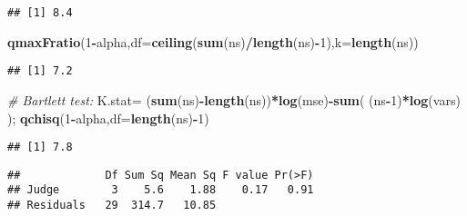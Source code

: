 \documentclass[12pt,]{book}
\newenvironment{Shaded}{\begin{snugshade}}{\end{snugshade}}
\newcommand{\KeywordTok}[1]{\textcolor[rgb]{0.13,0.29,0.53}{\textbf{#1}}}
\newcommand{\DataTypeTok}[1]{\textcolor[rgb]{0.13,0.29,0.53}{#1}}
\newcommand{\DecValTok}[1]{\textcolor[rgb]{0.00,0.00,0.81}{#1}}
\newcommand{\StringTok}[1]{\textcolor[rgb]{0.31,0.60,0.02}{#1}}
\newcommand{\CommentTok}[1]{\textcolor[rgb]{0.56,0.35,0.01}{\textit{#1}}}
\newcommand{\OperatorTok}[1]{\textcolor[rgb]{0.81,0.36,0.00}{\textbf{#1}}}
\newcommand{\NormalTok}[1]{#1}
\begin{document}
\begin{verbatim}
## [1] 8.4
\end{verbatim}

\begin{Shaded}
\begin{Highlighting}[]
\KeywordTok{qmaxFratio}\NormalTok{(}\DecValTok{1}\OperatorTok{-}\NormalTok{alpha,}\DataTypeTok{df=}\KeywordTok{ceiling}\NormalTok{(}\KeywordTok{sum}\NormalTok{(ns)}\OperatorTok{/}\KeywordTok{length}\NormalTok{(ns)}\OperatorTok{-}\DecValTok{1}\NormalTok{),}\DataTypeTok{k=}\KeywordTok{length}\NormalTok{(ns))}
\end{Highlighting}
\end{Shaded}

\begin{verbatim}
## [1] 7.2
\end{verbatim}

\begin{Shaded}
\begin{Highlighting}[]
\CommentTok{# Bartlett test:}
\NormalTok{K.stat=}\StringTok{ }\NormalTok{(}\KeywordTok{sum}\NormalTok{(ns)}\OperatorTok{-}\KeywordTok{length}\NormalTok{(ns))}\OperatorTok{*}\KeywordTok{log}\NormalTok{(mse)}\OperatorTok{-}\KeywordTok{sum}\NormalTok{( (ns}\OperatorTok{-}\DecValTok{1}\NormalTok{)}\OperatorTok{*}\KeywordTok{log}\NormalTok{(vars) );}
\KeywordTok{qchisq}\NormalTok{(}\DecValTok{1}\OperatorTok{-}\NormalTok{alpha,}\DataTypeTok{df=}\KeywordTok{length}\NormalTok{(ns)}\OperatorTok{-}\DecValTok{1}\NormalTok{)}
\end{Highlighting}
\end{Shaded}

\begin{verbatim}
## [1] 7.8
\end{verbatim}

\begin{Shaded}
\end{Shaded}

\begin{verbatim}
##             Df Sum Sq Mean Sq F value Pr(>F)
## Judge        3    5.6    1.88    0.17   0.91
## Residuals   29  314.7   10.85
\end{verbatim}
\end{document}
